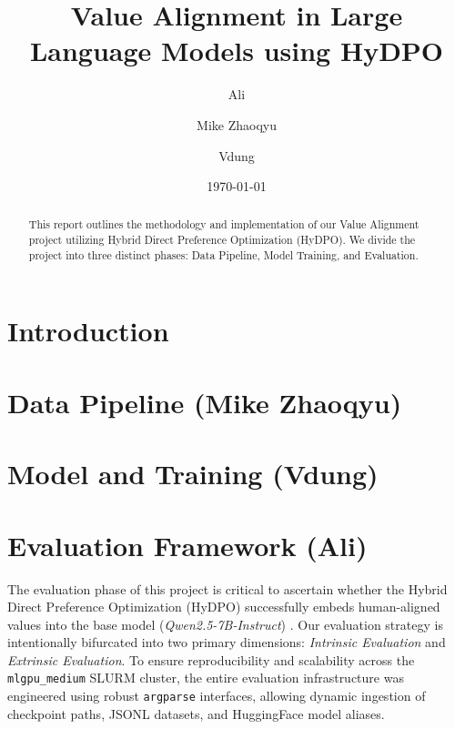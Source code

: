 \documentclass[11pt,a4paper]{article}
\title{Value Alignment in Large Language Models using HyDPO}
\author{Ali \and Mike Zhaoqyu \and Vdung}
\date{\today}
\begin{document}
\maketitle

\begin{abstract}
This report outlines the methodology and implementation of our Value Alignment project utilizing Hybrid Direct Preference Optimization (HyDPO). We divide the project into three distinct phases: Data Pipeline, Model Training, and Evaluation.
\end{abstract}

\section{Introduction}

\section{Data Pipeline (Mike Zhaoqyu)}
\label{sec:data}
\vspace{5cm}

\section{Model and Training (Vdung)}
\label{sec:model}
\vspace{5cm}

\section{Evaluation Framework (Ali)}
\label{sec:evaluation}

The evaluation phase of this project is critical to ascertain whether the Hybrid Direct Preference Optimization (HyDPO) \cite{rafailov2023direct} successfully embeds human-aligned values into the base model (\textit{Qwen2.5-7B-Instruct}) \cite{qwen2.5}. Our evaluation strategy is intentionally bifurcated into two primary dimensions: \textit{Intrinsic Evaluation} and \textit{Extrinsic Evaluation}. To ensure reproducibility and scalability across the \texttt{mlgpu\_medium} SLURM cluster, the entire evaluation infrastructure was engineered using robust \texttt{argparse} interfaces, allowing dynamic ingestion of checkpoint paths, JSONL datasets, and HuggingFace model aliases.
\end{document}
